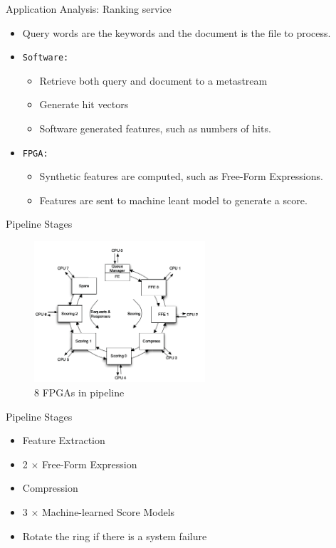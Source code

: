 \documentclass[t]{beamer}
\begin{document}
\begin{frame}{Application Analysis: Ranking service}
    \begin{itemize}
        \item Query words are the keywords and the document is the file to process.
        \item {\tt{Software:}} 
            \begin{itemize}
                \item Retrieve both query and document to a metastream
                \item Generate hit vectors
                \item Software generated features, such as numbers of hits.
            \end{itemize}
        \item {\tt{FPGA:}} 
            \begin{itemize}
                \item Synthetic features are computed, such as Free-Form Expressions.
                \item Features are sent to machine leant model to generate a score.
            \end{itemize}
    \end{itemize}
\end{frame}

\begin{frame}{Pipeline Stages}
    \begin{figure}
        \includegraphics[width=2.5in]{img/fpga-pipeline.png}
        \caption{8 FPGAs in pipeline}
    \end{figure}
\end{frame}

\begin{frame}{Pipeline Stages}
    \begin{itemize}
        \item Feature Extraction
        \item 2 $\times$ Free-Form Expression
        \item Compression
        \item 3 $\times$ Machine-learned Score Models
        \item Rotate the ring if there is a system failure
    \end{itemize}
\end{frame}
\end{document}
